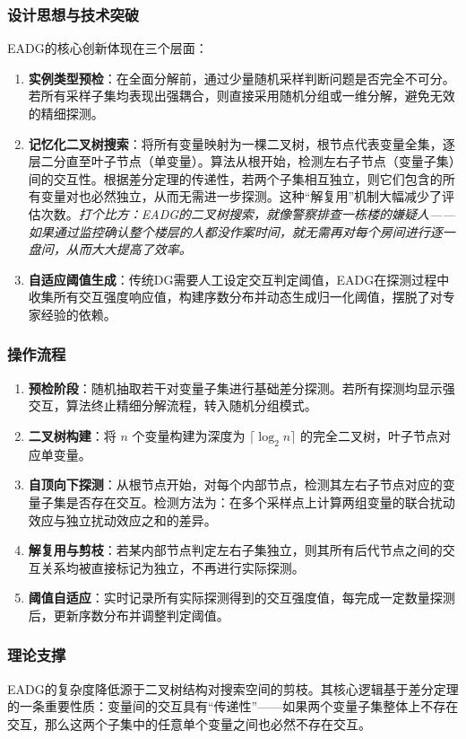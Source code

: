 \subsubsection{设计思想与技术突破}
EADG的核心创新体现在三个层面：
\begin{enumerate}
    \item \textbf{实例类型预检}：在全面分解前，通过少量随机采样判断问题是否完全不可分。若所有采样子集均表现出强耦合，则直接采用随机分组或一维分解，避免无效的精细探测。
    \item \textbf{记忆化二叉树搜索}：将所有变量映射为一棵二叉树，根节点代表变量全集，逐层二分直至叶子节点（单变量）。算法从根开始，检测左右子节点（变量子集）间的交互性。根据差分定理的传递性，若两个子集相互独立，则它们包含的所有变量对也必然独立，从而无需进一步探测。这种“解复用”机制大幅减少了评估次数。\textit{打个比方：EADG的二叉树搜索，就像警察排查一栋楼的嫌疑人——如果通过监控确认整个楼层的人都没作案时间，就无需再对每个房间进行逐一盘问，从而大大提高了效率。}
    \item \textbf{自适应阈值生成}：传统DG需要人工设定交互判定阈值，EADG在探测过程中收集所有交互强度响应值，构建序数分布并动态生成归一化阈值，摆脱了对专家经验的依赖。
\end{enumerate}

\subsubsection{操作流程}
\begin{enumerate}
    \item \textbf{预检阶段}：随机抽取若干对变量子集进行基础差分探测。若所有探测均显示强交互，算法终止精细分解流程，转入随机分组模式。
    \item \textbf{二叉树构建}：将 $n$ 个变量构建为深度为 $\lceil \log_2 n \rceil$ 的完全二叉树，叶子节点对应单变量。
    \item \textbf{自顶向下探测}：从根节点开始，对每个内部节点，检测其左右子节点对应的变量子集是否存在交互。检测方法为：在多个采样点上计算两组变量的联合扰动效应与独立扰动效应之和的差异。
    \item \textbf{解复用与剪枝}：若某内部节点判定左右子集独立，则其所有后代节点之间的交互关系均被直接标记为独立，不再进行实际探测。
    \item \textbf{阈值自适应}：实时记录所有实际探测得到的交互强度值，每完成一定数量探测后，更新序数分布并调整判定阈值。
\end{enumerate}

\subsubsection{理论支撑}
EADG的复杂度降低源于二叉树结构对搜索空间的剪枝。其核心逻辑基于差分定理的一条重要性质：变量间的交互具有“传递性”——如果两个变量子集整体上不存在交互，那么这两个子集中的任意单个变量之间也必然不存在交互。

